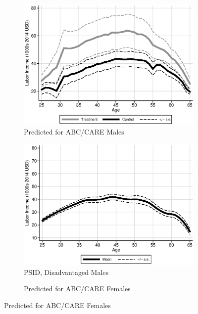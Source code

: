 \begin{figure}
\centering
\caption{Labor Income Profiles, Prediction Based on $W,Z$}\label{fig:labor-income-profiles}
\begin{subfigure}[h]{0.4\textwidth}
		\centering
		\caption{Predicted for ABC/CARE Males} \label{fig:abcare1}
		\includegraphics[width=\textwidth]{output/labor_25-60_male_5.eps}
\end{subfigure}%
\begin{subfigure}[h]{0.4\textwidth}
	\centering
	\caption{PSID, Disadvantaged Males} \label{fig:psid1}
		\includegraphics[width=\textwidth]{output/psid_incomeprofiles_s1.eps}
\end{subfigure}
\begin{subfigure}[h]{0.4\textwidth}
		\centering
		\caption{Predicted for ABC/CARE Females} \label{fig:abcare0}

\end{subfigure}
\end{figure}
